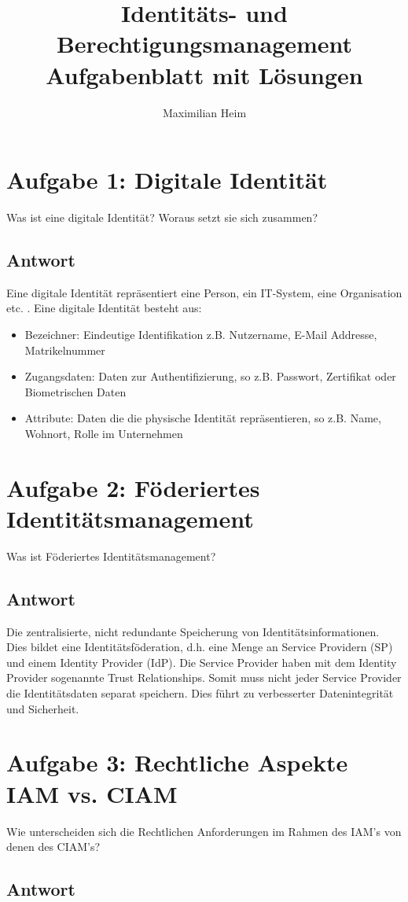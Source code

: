 \documentclass[11pt]{article}
\author{Maximilian Heim}
\title{Identitäts- und Berechtigungsmanagement \\ \large{}Aufgabenblatt mit Lösungen}
\begin{document}
\maketitle
\section*{Aufgabe 1: Digitale Identität}
Was ist eine digitale Identität? Woraus setzt sie sich zusammen?
\subsection*{Antwort}
Eine digitale Identität repräsentiert eine Person, ein IT-System, eine Organisation etc. . Eine digitale Identität besteht aus:
\begin{itemize}
    \item Bezeichner: Eindeutige Identifikation z.B. Nutzername, E-Mail Addresse, Matrikelnummer
    \item Zugangsdaten: Daten zur Authentifizierung, so z.B. Passwort, Zertifikat oder Biometrischen Daten
    \item Attribute: Daten die die physische Identität repräsentieren, so z.B. Name, Wohnort, Rolle im Unternehmen
\end{itemize}

\section*{Aufgabe 2: Föderiertes Identitätsmanagement}
Was ist Föderiertes Identitätsmanagement?
\subsection*{Antwort}
Die zentralisierte, nicht redundante Speicherung von Identitätsinformationen. Dies bildet eine Identitätsföderation, d.h. eine Menge an Service Providern (SP) und einem Identity Provider (IdP). Die Service Provider haben mit dem Identity Provider sogenannte Trust Relationships. Somit muss nicht jeder Service Provider die Identitätsdaten separat speichern. Dies führt zu verbesserter Datenintegrität und Sicherheit.

\section*{Aufgabe 3: Rechtliche Aspekte IAM vs. CIAM}
Wie unterscheiden sich die Rechtlichen Anforderungen im Rahmen des IAM's von denen des CIAM's?
\subsection*{Antwort}
\end{document}
